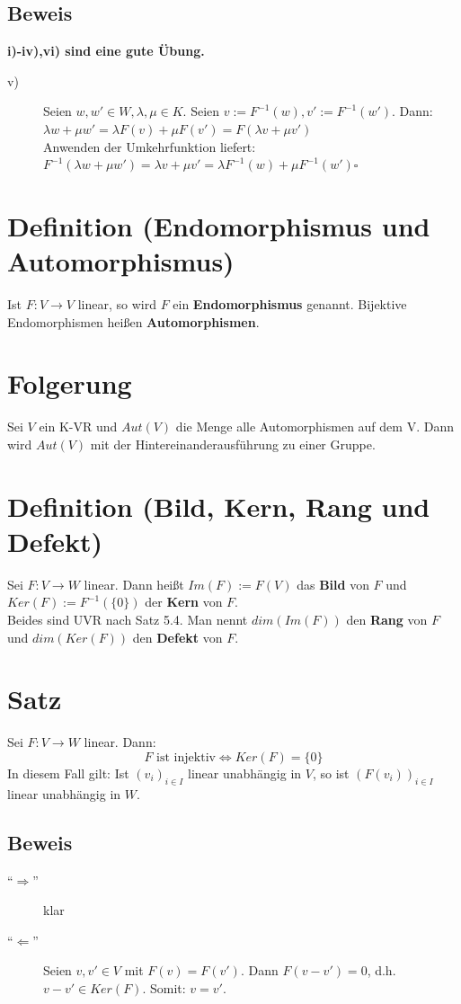 \documentclass{scrbook}
\begin{document}
\subsection*{Beweis}
\textbf{i)-iv),vi) sind eine gute Übung.}
\begin{description}
\item[v)] Seien $w,w' \in W, \lambda,\mu \in K$. Seien $v:= F^{-1}(w), v' := F^{-1}(w')$. Dann: $\lambda w+ \mu w' = \lambda F(v) + \mu F(v') = F(\lambda v + \mu v')$\\
Anwenden der Umkehrfunktion liefert:\\
$F^{-1}(\lambda w + \mu w') = \lambda v + \mu v' = \lambda F^{-1}(w)+ \mu F^{-1}(w') \square$
\end{description}
\section{Definition (Endomorphismus und Automorphismus)}
Ist $F:V \rightarrow V$ linear, so wird $F$ ein \textbf{Endomorphismus} genannt. Bijektive Endomorphismen heißen \textbf{Automorphismen}.
\section{Folgerung}
Sei $V$ ein K-VR und $Aut(V)$ die Menge alle Automorphismen auf dem V. Dann wird $Aut(V)$ mit der Hintereinanderausführung zu einer Gruppe.
\section{Definition (Bild, Kern, Rang und Defekt)}
Sei $F:V\rightarrow W$ linear. Dann heißt $Im(F) := F(V)$ das \textbf{Bild} von $F$ und $Ker(F) := F^{-1}(\{0\})$ der \textbf{Kern} von $F$.\\
Beides sind UVR nach Satz 5.4. Man nennt $dim(Im(F))$ den \textbf{Rang} von $F$ und $dim(Ker(F))$ den \textbf{Defekt} von $F$.
\section{Satz}
Sei $F:V\rightarrow W $ linear. Dann:
\[F \text{ ist injektiv} \Leftrightarrow Ker(F) = \{0\}\] In diesem Fall gilt: Ist $(v_i)_{i\in I}$ linear unabhängig in $V$, so ist $(F(v_i))_{i\in I}$ linear unabhängig in $W$.
\subsection*{Beweis}
\begin{description}
\item["`$\Rightarrow$"'] klar
\item["`$\Leftarrow$"'] Seien $v,v' \in V$ mit $F(v) = F(v')$. Dann $F(v-v')=0$, d.h. $v-v' \in Ker(F)$. Somit: $v=v'$.
\end{description}
\end{document}
